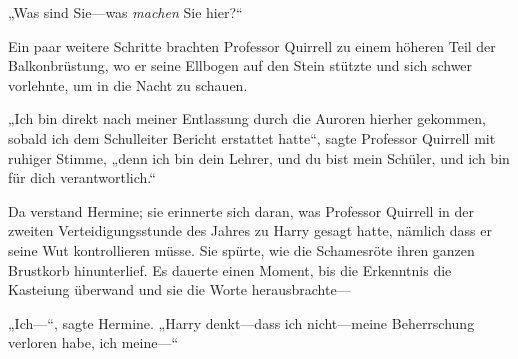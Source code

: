 „Was sind Sie—was \emph{machen} Sie hier?“

Ein paar weitere Schritte brachten Professor Quirrell zu einem höheren Teil der Balkonbrüstung, wo er seine Ellbogen auf den Stein stützte und sich schwer vorlehnte, um in die Nacht zu schauen.

„Ich bin direkt nach meiner Entlassung durch die Auroren hierher gekommen, sobald ich dem Schulleiter Bericht erstattet hatte“, sagte Professor Quirrell mit ruhiger Stimme, „denn ich bin dein Lehrer, und du bist mein Schüler, und ich bin für dich verantwortlich.“

Da verstand Hermine; sie erinnerte sich daran, was Professor Quirrell in der zweiten Verteidigungsstunde des Jahres zu Harry gesagt hatte, nämlich dass er seine Wut kontrollieren müsse. Sie spürte, wie die Schamesröte ihren ganzen Brustkorb hinunterlief. Es dauerte einen Moment, bis die Erkenntnis die Kasteiung überwand und sie die Worte herausbrachte—

„Ich—“, sagte Hermine. „Harry denkt—dass ich nicht—meine Beherrschung verloren habe, ich meine—“


